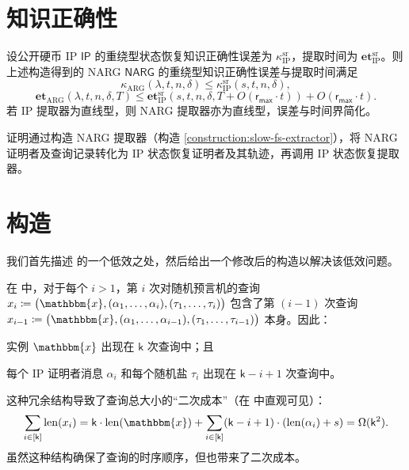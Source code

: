 \documentclass[american,singlepageview]{snargs-book-zh}
\newcommand{\DefineEqual}{\coloneqq}
\newcommand{\BitSize}[1]{\mathrm{len}(#1)}
\newcommand{\Instance}{\mathbbm{x}}
\newcommand{\InstanceSize}{n}
\newcommand{\ProtoSalt}{\tau}
\newcommand{\ProtoKnowledgeError}{\kappa}
\newcommand{\ProtoKnowledgeTime}{\mathbf{et}}
\newcommand{\ProtoRoundComplexity}{\mathsf{k}}
\newcommand{\ProtoRandomnessComplexity}{\mathsf{r}}
\newcommand{\RoundIndex}{i}
\newcommand{\SRSuperscript}{\mathrm{sr}}
\newcommand{\ProtoSRKnowledgeError}{\ProtoKnowledgeError^{\SRSuperscript}}
\newcommand{\IPSymbol}{\mathsf{IP}}
\newcommand{\IPSubscript}{\scriptscriptstyle\mathrm{IP}}
\newcommand{\IPRoundComplexity}{\ProtoRoundComplexity}
\newcommand{\IPRandomnessComplexity}{\ProtoRandomnessComplexity}
\newcommand{\IPMaxRandomnessComplexity}{\IPRandomnessComplexity_{{\scriptscriptstyle\mathsf{max}}}}
\newcommand{\IPProverMessage}{\alpha}
\newcommand{\NARGSymbol}{\mathsf{NARG}}
\newcommand{\ARGSubscript}{\scriptscriptstyle\mathrm{ARG}}
\newcommand{\ARGKnowledgeTime}{\ProtoKnowledgeTime_{\ARGSubscript}}
\newcommand{\ARGKnowledgeError}{\ProtoKnowledgeError_{\ARGSubscript}}
\newcommand{\ROQueryBound}{t}
\newcommand{\SecurityParameter}{\lambda}
\newcommand{\PrivacyParameter}{s}
\newcommand{\ROQuery}{x}
\newcommand{\RandSaltString}{\ProtoSalt}
\newcommand{\RandSaltSize}{s}
\newcommand{\SlowFSLaterQuery}[1]{\big(\Instance,(\IPProverMessage_{1},\dots,\IPProverMessage_{#1}),(\RandSaltString_{1},\dots,\RandSaltString_{#1})\big)}
\newcommand{\IPSRKnowledgeError}{\ProtoSRKnowledgeError_{\IPSubscript}}
\newcommand{\IPSRKnowledgeTime}{\ProtoKnowledgeTime_{\IPSubscript}^{\SRSuperscript}}
\begin{document}
\section{知识正确性}
\label{section:slow-fs-knowledge-soundness}

\begin{ImportantTheorem}{}{}
设公开硬币 IP $\IPSymbol$ 的重绕型状态恢复知识正确性误差为 $\IPSRKnowledgeError$，提取时间为 $\IPSRKnowledgeTime$。则上述构造得到的 NARG $\NARGSymbol$ 的重绕型知识正确性误差与提取时间满足
\[
\ARGKnowledgeError(\SecurityParameter,\ROQueryBound,\InstanceSize,\delta)
\le
\IPSRKnowledgeError(\PrivacyParameter,\ROQueryBound,\InstanceSize,\delta),
\]
\[
\ARGKnowledgeTime(\SecurityParameter,\ROQueryBound,\InstanceSize,\delta,T)
\le
\IPSRKnowledgeTime(\PrivacyParameter,\ROQueryBound,\InstanceSize,\delta,T+O(\IPMaxRandomnessComplexity\cdot\ROQueryBound))
+O(\IPMaxRandomnessComplexity\cdot\ROQueryBound).
\]
若 IP 提取器为直线型，则 NARG 提取器亦为直线型，误差与时间界简化。
\end{ImportantTheorem}

证明通过构造 NARG 提取器（构造 \ref{construction:slow-fs-extractor}），将 NARG 证明者及查询记录转化为 IP 状态恢复证明者及其轨迹，再调用 IP 状态恢复提取器。


\section{构造}
\label{section:fast-fs-for-ip}

我们首先描述  的一个低效之处，然后给出一个修改后的构造以解决该低效问题。

在  中，对于每个 $\RoundIndex>1$，第 $\RoundIndex$ 次对随机预言机的查询 $\ROQuery_{\RoundIndex} \DefineEqual \SlowFSLaterQuery{\RoundIndex}$ 包含了第 $(\RoundIndex-1)$ 次查询 $\ROQuery_{\RoundIndex-1} \DefineEqual \SlowFSLaterQuery{\RoundIndex-1}$ 本身。因此：
\begin{inparaenum}[(i)]
  \item 实例 $\Instance$ 出现在 $\IPRoundComplexity$ 次查询中；且
  \item 每个 IP 证明者消息 $\IPProverMessage_{\RoundIndex}$ 和每个随机盐 $\RandSaltString_{\RoundIndex}$ 出现在 $\IPRoundComplexity-\RoundIndex+1$ 次查询中。
\end{inparaenum}
这种冗余结构导致了查询总大小的“二次成本”（在  中直观可见）：
\[
\sum_{\RoundIndex \in [\IPRoundComplexity]}
\BitSize{\ROQuery_{\RoundIndex}}
=
\IPRoundComplexity \cdot \BitSize{\Instance}
+
\sum_{\RoundIndex \in [\IPRoundComplexity]}
(\IPRoundComplexity-\RoundIndex+1) \cdot (\BitSize{\IPProverMessage_{\RoundIndex}}+\RandSaltSize)
=
\Omega(\IPRoundComplexity^2).
\]
虽然这种结构确保了查询的时序顺序，但也带来了二次成本。
\end{document}
